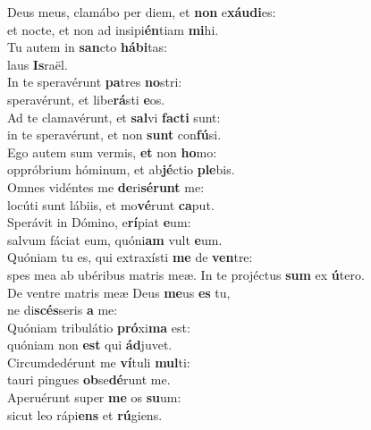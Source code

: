 \evenverse Deus meus, clamábo per diem, et \textbf{non} e\textbf{xáu}\textbf{di}es:~\*\\
\evenverse et nocte, et non ad insipi\textbf{én}tiam \textbf{mi}hi.\\
\oddverse Tu autem in \textbf{san}cto \textbf{há}\textbf{bi}tas:~\*\\
\oddverse laus \textbf{Is}raël.\\
\evenverse In te speravérunt \textbf{pa}tres \textbf{no}stri:~\*\\
\evenverse speravérunt, et libe\textbf{rá}sti \textbf{e}os.\\
\oddverse Ad te clamavérunt, et \textbf{sal}vi \textbf{fa}\textbf{cti} sunt:~\*\\
\oddverse in te speravérunt, et non \textbf{sunt} con\textbf{fú}si.\\
\evenverse Ego autem sum vermis, \textbf{et} non \textbf{ho}mo:~\*\\
\evenverse oppróbrium hóminum, et ab\textbf{jé}ctio \textbf{ple}bis.\\
\oddverse Omnes vidéntes me \textbf{de}ri\textbf{sé}\textbf{runt} me:~\*\\
\oddverse locúti sunt lábiis, et mo\textbf{vé}runt \textbf{ca}put.\\
\evenverse Sperávit in Dómino, e\textbf{rí}piat \textbf{e}um:~\*\\
\evenverse salvum fáciat eum, quóni\textbf{am} vult \textbf{e}um.\\
\oddverse Quóniam tu es, qui extraxísti \textbf{me} de \textbf{ven}tre:~\*\\
\oddverse spes mea ab ubéribus matris meæ. In te projéctus \textbf{sum} ex \textbf{ú}tero.\\
\evenverse De ventre matris meæ Deus \textbf{me}us \textbf{es} tu,~\*\\
\evenverse ne di\textbf{scés}seris \textbf{a} me:\\
\oddverse Quóniam tribulátio \textbf{pró}xi\textbf{ma} est:~\*\\
\oddverse quóniam non \textbf{est} qui \textbf{ád}juvet.\\
\evenverse Circumdedérunt me \textbf{ví}tuli \textbf{mul}ti:~\*\\
\evenverse tauri pingues \textbf{ob}se\textbf{dé}runt me.\\
\oddverse Aperuérunt super \textbf{me} os \textbf{su}um:~\*\\
\oddverse sicut leo rápi\textbf{ens} et \textbf{rú}giens.\\
